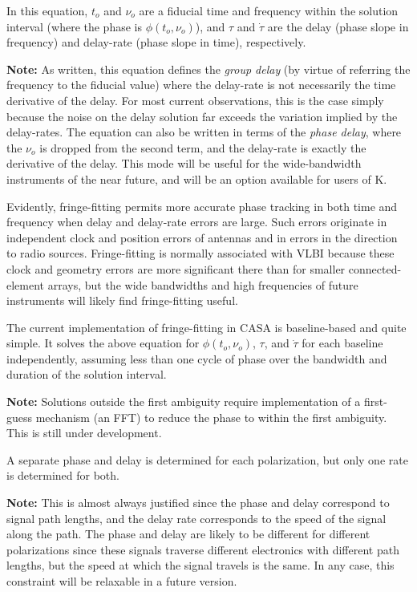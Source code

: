 In this equation, $t_o$ and $\nu_o$ are a fiducial time and frequency
within the solution interval (where the phase is $\phi(t_o,\nu_o)$),
and $\tau$ and $\dot{\tau}$ are the delay (phase slope in frequency)
and delay-rate (phase slope in time), respectively.

{\bf Note:} As written, this equation defines the {\it group delay}
(by virtue of referring the frequency to the fiducial value) where the
delay-rate is not necessarily the time derivative of the delay. For
most current observations, this is the case simply because the noise
on the delay solution far exceeds the variation implied by the
delay-rates.  The equation can also be written in terms of the {\it
phase delay}, where the $\nu_o$ is dropped from the second term, and
the delay-rate is exactly the derivative of the delay.  This mode will
be useful for the wide-bandwidth instruments of the near future, and
will be an option available for users of K.

Evidently, fringe-fitting permits more accurate phase tracking in both
time and frequency when delay and delay-rate errors are large.  Such
errors originate in independent clock and position errors of antennas
and in errors in the direction to radio sources.  Fringe-fitting is
normally associated with VLBI because these clock and geometry errors
are more significant there than for smaller connected-element arrays,
but the wide bandwidths and high frequencies of future instruments
will likely find fringe-fitting useful.

The current implementation of fringe-fitting in CASA is baseline-based
and quite simple.  It solves the above equation for $\phi(t_o,\nu_o)$,
$\tau$, and $\dot{\tau}$ for each baseline independently, assuming
less than one cycle of phase over the bandwidth and duration of the
solution interval.

{\bf Note:} Solutions outside the first ambiguity require
implementation of a first-guess mechanism (an FFT) to reduce the phase
to within the first ambiguity.  This is still under development.

A separate phase and delay is determined for each polarization, but
only one rate is determined for both.

{\bf Note:} This is almost always justified since the phase and delay
correspond to signal path lengths, and the delay rate corresponds to
the speed of the signal along the path.  The phase and delay are
likely to be different for different polarizations since these signals
traverse different electronics with different path lengths, but the
speed at which the signal travels is the same.  In any case, this
constraint will be relaxable in a future version.

